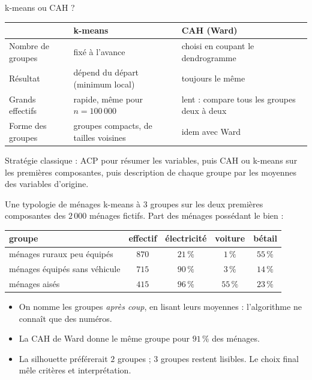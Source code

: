 \documentclass[aspectratio=169,11pt]{beamer}
\begin{document}
\begin{frame}{k-means ou CAH ?}
  \small
  \renewcommand{\arraystretch}{1.2}
  \begin{tabular}{p{}p{}p{}}
    \toprule
    & \textbf{k-means} & \textbf{CAH (Ward)} \\
    \midrule
    Nombre de groupes & fixé à l'avance & choisi en coupant le dendrogramme \\
    Résultat & dépend du départ (minimum local) & toujours le même \\
    Grands effectifs & rapide, même pour $n=100\,000$ & lent : compare tous les groupes deux à deux \\
    Forme des groupes & groupes compacts, de tailles voisines & idem avec Ward \\
    \bottomrule
  \end{tabular}
  \vskip2mm
  \begin{aretenir}
    Stratégie classique : ACP pour résumer les variables, puis CAH ou k-means sur les premières composantes, puis description de chaque groupe par les moyennes des variables d'origine.
  \end{aretenir}
\end{frame}

\begin{frame}{Une typologie de ménages}
  \small
  k-means à $3$ groupes sur les deux premières composantes des $2\,000$ ménages fictifs. Part des ménages possédant le bien :
  \begin{center}
    \renewcommand{\arraystretch}{1.25}
    \begin{tabular}{lcccc}
      \toprule
      groupe & effectif & électricité & voiture & bétail \\
      \midrule
      ménages ruraux peu équipés & $870$ & $21\,\%$ & $1\,\%$ & $55\,\%$ \\
      ménages équipés sans véhicule & $715$ & $90\,\%$ & $3\,\%$ & $14\,\%$ \\
      ménages aisés & $415$ & $96\,\%$ & $55\,\%$ & $23\,\%$ \\
      \bottomrule
    \end{tabular}
  \end{center}
  \begin{itemize}
    \item On nomme les groupes \emph{après coup}, en lisant leurs moyennes : l'algorithme ne connaît que des numéros.
    \item La CAH de Ward donne le même groupe pour $91\,\%$ des ménages.
    \item La silhouette préférerait $2$ groupes ; $3$ groupes restent lisibles. Le choix final mêle critères et interprétation.
  \end{itemize}
\end{frame}
\end{document}
